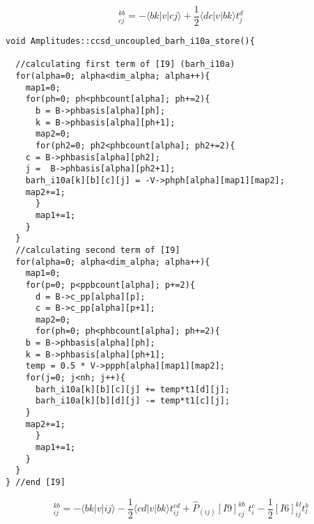 \begin{equation*}
[I9]_{cj}^{kb} = -\langle bk|v|cj\rangle + \frac{1}{2}\langle dc|v|bk\rangle t_j^d 
\end{equation*}
\begin{lstlisting}[label={list:impl:intermediate9},caption={implementation of I9 in the amp1 class function ccsd\_uncoupled\_barh\_i10a\_store}]
void Amplitudes::ccsd_uncoupled_barh_i10a_store(){
  
  //calculating first term of [I9] (barh_i10a)
  for(alpha=0; alpha<dim_alpha; alpha++){
    map1=0;
    for(ph=0; ph<phbcount[alpha]; ph+=2){ 
      b = B->phbasis[alpha][ph];
      k = B->phbasis[alpha][ph+1];
      map2=0;
      for(ph2=0; ph2<phbcount[alpha]; ph2+=2){
	c = B->phbasis[alpha][ph2];
	j =  B->phbasis[alpha][ph2+1];  
	barh_i10a[k][b][c][j] = -V->phph[alpha][map1][map2];
	map2+=1;
      }
      map1+=1;
    }
  }
  //calculating second term of [I9]
  for(alpha=0; alpha<dim_alpha; alpha++){
    map1=0;
    for(p=0; p<ppbcount[alpha]; p+=2){ 
      d = B->c_pp[alpha][p];
      c = B->c_pp[alpha][p+1];
      map2=0;
      for(ph=0; ph<phbcount[alpha]; ph+=2){
	b = B->phbasis[alpha][ph];
	k = B->phbasis[alpha][ph+1];
	temp = 0.5 * V->ppph[alpha][map1][map2];
	for(j=0; j<nh; j++){
	  barh_i10a[k][b][c][j] += temp*t1[d][j];
	  barh_i10a[k][b][d][j] -= temp*t1[c][j];
	}
	map2+=1;
      }
      map1+=1;
    }
  }
} //end [I9]
\end{lstlisting}

\begin{equation*}
[I10]_{ij}^{kb}=-\langle bk|v|ij\rangle-\frac{1}{2} \langle cd|v|bk\rangle t_{ij}^{cd}+\hat{P}_{(ij)}[I9]_{cj}^{kb}\phantom{.}t_i^c-\frac{1}{2} [I6]_{ij}^{kl}t_l^b 
\end{equation*}

